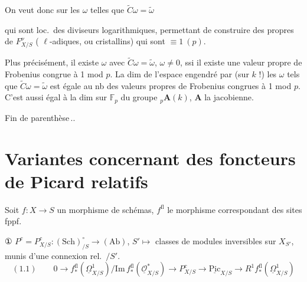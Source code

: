 \documentclass[11pt,a4paper]{article}
\begin{document}
On veut donc   sur les $\omega$ telles que $\tilde{C}\omega = \tilde{\omega}$

\ill{} qui sont loc.\ des diviseurs logarithmiques, permettant de construire des   propres de $F^{\nu}_{X/S}$  (\struck{\ill{}} $\ell$-adiques, ou cristallins) qui sont $\equiv 1 \ (p)$.

Plus précisément, il existe $\omega$ avec $\tilde{C}\omega = \tilde{\omega}$, $\omega \neq 0$, ssi il existe une valeur propre de Frobenius congrue à 1 mod $p$. La dim de l'espace  engendré par (sur $k$ !) les $\omega$ tels que $\tilde{C}\omega = \tilde{\omega}$ est égale au nb des valeurs propres de Frobenius congrues à 1 mod $p$. C'est aussi égal à la dim sur $\mathbb{F}_p$ du groupe   ${}_{p}\mathbf{A}(k)$, $\mathbf{A}$ la jacobienne.

Fin de parenthèse\,..

\section{Variantes concernant des foncteurs de Picard relatifs}

Soit $f : X \to S$ un morphisme de schémas, $f^{\mathrm{fl}}$ le morphisme correspondant des sites fppf.

① $P^{c} = P^{c}_{X/S} : (\mathrm{Sch})^{\circ}_{/S} \to (\mathrm{Ab})$,   $S' \mapsto$ classes de modules inversibles sur $X_{S'}$, munis d'une connexion rel.\ $/S'$.
\[
(1.1) \qquad 0 \to f^{\mathrm{fl}}_{*}(\underline{\Omega}^{1}_{X/S})/\mathrm{Im}\, f^{\mathrm{fl}}_{*}(\underline{\mathcal{O}}^{*}_{X/S}) \to P^{c}_{X/S} \to \underline{\mathrm{Pic}}_{X/S} \to R^{1}f^{\mathrm{fl}}_{*}(\underline{\Omega}^{1}_{X/S})
\]
\end{document}

